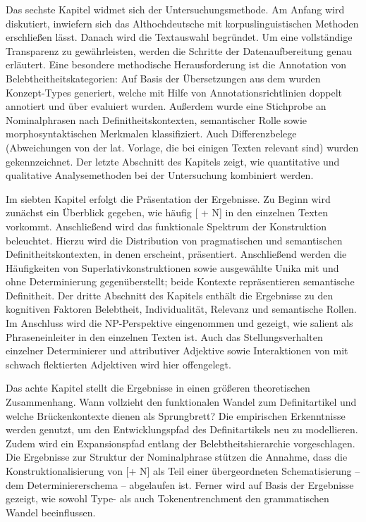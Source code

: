 Das sechste Kapitel widmet sich der Untersuchungsmethode. Am Anfang wird diskutiert, inwiefern sich das Althochdeutsche mit korpuslinguistischen Methoden erschließen lässt. Danach wird die Textauswahl begründet. Um eine vollständige Transparenz zu gewährleisten, werden die Schritte der Datenaufbereitung genau erläutert. Eine besondere methodische Herausforderung ist die Annotation von Belebtheitheitskategorien: Auf Basis der Übersetzungen aus dem  wurden Konzept-Types generiert, welche mit Hilfe von Annotationsrichtlinien doppelt annotiert und über   evaluiert wurden. Außerdem wurde eine Stichprobe an Nominalphrasen nach Definitheitskontexten, semantischer Rolle sowie morphosyntaktischen Merkmalen klassifiziert. Auch Differenzbelege (Abweichungen von der lat. Vorlage, die bei einigen Texten relevant sind) wurden gekennzeichnet. Der letzte Abschnitt des Kapitels zeigt, wie quantitative und qualitative Analysemethoden bei der Untersuchung kombiniert werden. 
  
Im siebten Kapitel erfolgt die Präsentation der Ergebnisse. Zu Beginn wird zunächst ein Überblick gegeben, wie häufig [ + N] in den einzelnen Texten vorkommt. Anschließend wird das funktionale Spektrum der Konstruktion beleuchtet. Hierzu wird die Distribution von pragmatischen und semantischen Definitheitskontexten, in denen  erscheint, präsentiert. Anschließend werden die Häufigkeiten von Superlativkonstruktionen sowie ausgewählte Unika mit und ohne Determinierung gegenüberstellt; beide Kontexte repräsentieren semantische Definitheit. Der dritte Abschnitt des Kapitels enthält die Ergebnisse zu den kognitiven Faktoren Belebtheit, Individualität, Relevanz und semantische Rollen. Im Anschluss wird die NP-Perspektive eingenommen und gezeigt, wie salient  als Phraseneinleiter in den einzelnen Texten ist. Auch das Stellungsverhalten einzelner Determinierer und attributiver Adjektive sowie Interaktionen von  mit schwach flektierten Adjektiven wird hier offengelegt. 

Das achte Kapitel stellt die Ergebnisse in einen größeren theoretischen Zusammenhang. Wann vollzieht  den funktionalen Wandel zum Definitartikel und welche Brückenkontexte dienen als Sprungbrett? Die empirischen Erkenntnisse werden genutzt, um den Entwicklungspfad des Definitartikels neu zu modellieren. Zudem wird ein Expansionspfad entlang der Belebtheitshierarchie vorgeschlagen. Die Ergebnisse zur Struktur der Nominalphrase  stützen die Annahme, dass die Konstruktionalisierung von [+ N] als Teil einer übergeordneten Schematisierung -- dem Determiniererschema -- abgelaufen ist. Ferner wird auf Basis der Ergebnisse gezeigt, wie sowohl Type- als auch Tokenentrenchment den grammatischen Wandel beeinflussen.
